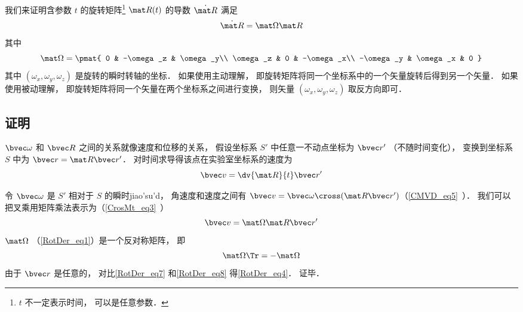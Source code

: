 

我们来证明含参数 $t$ 的旋转矩阵\footnote{$t$ 不一定表示时间， 可以是任意参数．} $\mat R(t)$ 的导数 $\dot{\mat R}$ 满足
\begin{equation}\label{RotDer_eq4}
\dot{\mat R} = \mat \Omega \mat R
\end{equation}
其中
\begin{equation}\label{RotDer_eq1}
\mat \Omega = \pmat{
0 & -\omega_z & \omega_y\\
\omega_z & 0 & -\omega_x\\
-\omega_y & \omega_x & 0
}
\end{equation}
其中 $(\omega_x, \omega_y, \omega_z)$ 是旋转的瞬时转轴的坐标． 如果使用主动理解， 即旋转矩阵将同一个坐标系中的一个矢量旋转后得到另一个矢量． 如果使用被动理解， 即旋转矩阵将同一个矢量在两个坐标系之间进行变换， 则矢量 $(\omega_x, \omega_y, \omega_z)$ 取反方向即可．

\subsection{证明}

$\bvec \omega$ 和 $\bvec R$ 之间的关系就像速度和位移的关系， 假设坐标系 $S'$ 中任意一不动点坐标为 $\bvec r'$ （不随时间变化）， 变换到坐标系 $S$ 中为 $\bvec r = \mat R \bvec r'$． 对时间求导得该点在实验室坐标系的速度为
\begin{equation}\label{RotDer_eq7}
\bvec v = \dv{\mat R}{t} \bvec r'
\end{equation}

令 $\bvec\omega$ 是 $S'$ 相对于 $S$ 的瞬时jiao'su'd， 角速度和速度之间有 $\bvec v = \bvec \omega \cross (\mat R \bvec r')$（\autoref{CMVD_eq5}~）． 我们可以把叉乘用矩阵乘法表示为（\autoref{CrosMt_eq3}~）
\begin{equation}\label{RotDer_eq8}
\bvec v = \mat\Omega \mat R \bvec r'
\end{equation}
$\mat\Omega$ （\autoref{RotDer_eq1}）是一个反对称矩阵， 即
\begin{equation}
\mat \Omega\Tr = -\mat \Omega
\end{equation}
由于 $\bvec r$ 是任意的， 对比\autoref{RotDer_eq7} 和\autoref{RotDer_eq8} 得\autoref{RotDer_eq4}． 证毕．
